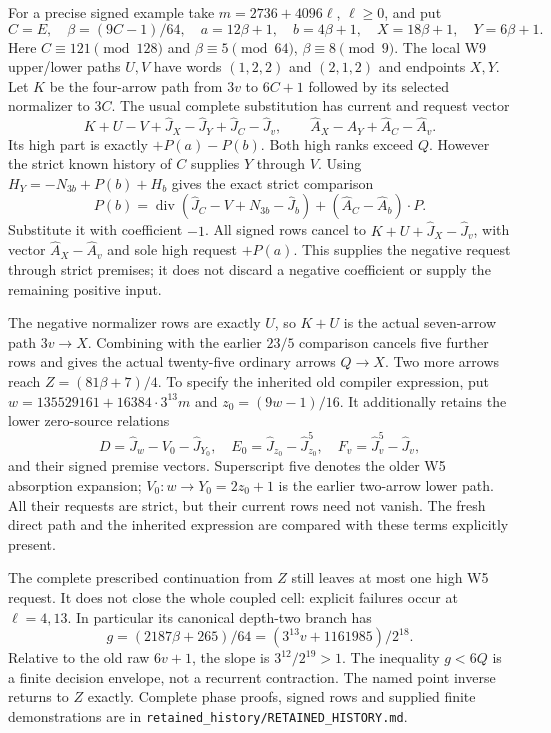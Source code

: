 \documentclass[11pt]{article}
\begin{document}
For a precise signed example take $m=2736+4096\ell$, $\ell\ge0$, and put
\[
 C=E,\quad \beta=(9C-1)/64,\quad
 a=12\beta+1,\quad b=4\beta+1,\quad
 X=18\beta+1,\quad Y=6\beta+1.
\]
Here $C\equiv121\pmod{128}$ and $\beta\equiv5\pmod{64}$,
$\beta\equiv8\pmod9$. The local W9 upper/lower paths $U,V$ have
words $(1,2,2)$ and $(2,1,2)$ and endpoints $X,Y$.
Let $K$ be the four-arrow path from $3v$ to $6C+1$ followed by its
selected normalizer to $3C$. The usual complete substitution has
current and request vector
\[
 K+U-V+\widehat J_X-\widehat J_Y+\widehat J_C-\widehat J_v,
 \qquad\widehat A_X-\widehat A_Y+\widehat A_C-\widehat A_v.
\]
Its high part is exactly $+P(a)-P(b)$. Both high ranks exceed $Q$.
However the strict known history of $C$ supplies $Y$ through $V$.
Using $H_Y=-N_{3b}+P(b)+H_b$ gives the exact strict comparison
\[
 P(b)=\operatorname{div}(\widehat J_C-V+N_{3b}-\widehat J_b)
               +(\widehat A_C-\widehat A_b)\cdot P.
\]
Substitute it with coefficient $-1$. All signed rows cancel to
$K+U+\widehat J_X-\widehat J_v$, with vector
$\widehat A_X-\widehat A_v$ and sole high request $+P(a)$.
This supplies the negative request through strict premises; it does not
discard a negative coefficient or supply the remaining positive input.

The negative normalizer rows are exactly $U$, so $K+U$ is the actual
seven-arrow path $3v\to X$. Combining with the earlier $23/5$
comparison cancels five further rows and gives the actual twenty-five
ordinary arrows $Q\to X$. Two more arrows reach
$Z=(81\beta+7)/4$. To specify the inherited old compiler expression,
put $w=135529161+16384\cdot3^{13}m$ and $z_0=(9w-1)/16$.
It additionally retains the lower zero-source relations
\[
 D=\widehat J_w-V_0-\widehat J_{Y_0},\quad
 E_0=\widehat J_{z_0}-\widehat J_{z_0}^{5},\quad
 F_v=\widehat J_v^{5}-\widehat J_v,
\]
and their signed premise vectors. Superscript five denotes the older
W5 absorption expansion; $V_0:w\to Y_0=2z_0+1$ is the earlier
two-arrow lower path. All their requests are strict, but their current rows need
not vanish. The fresh direct path and the inherited expression are
compared with these terms explicitly present.

The complete prescribed continuation from $Z$ still leaves at most one
high W5 request. It does not close the whole coupled cell: explicit
failures occur at $\ell=4,13$. In particular its canonical depth-two
branch has
\[
 g=(2187\beta+265)/64=(3^{13}v+1161985)/2^{18}.
\]
Relative to the old raw $6v+1$, the slope is $3^{12}/2^{19}>1$.
The inequality $g<6Q$ is a finite decision envelope, not a recurrent
contraction. The named point inverse returns to $Z$ exactly.
Complete phase proofs, signed rows and supplied finite demonstrations
are in \texttt{retained\_history/RETAINED\_HISTORY.md}.
\end{document}
